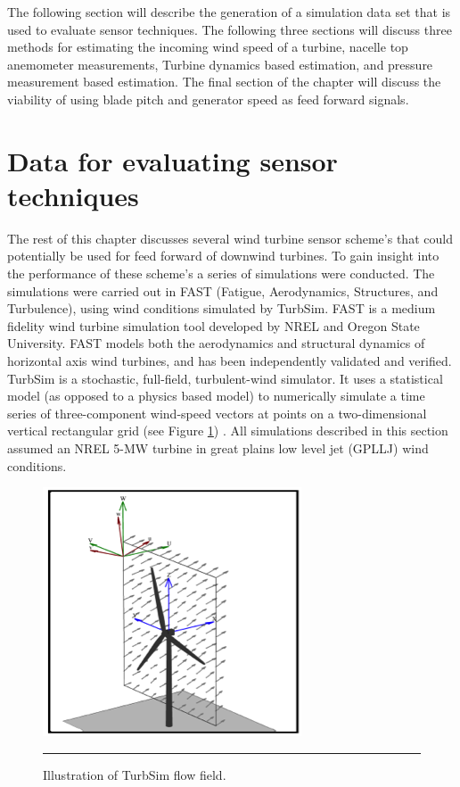 The following section will describe the generation of a simulation data set that is used to evaluate sensor techniques. The following three sections will discuss three methods for estimating the incoming wind speed of a turbine, nacelle top anemometer measurements, Turbine dynamics based estimation, and pressure measurement based estimation.  The final section of the chapter will discuss the viability of using blade pitch and generator speed as feed forward signals.




\section{Data for evaluating sensor techniques} \label{section2-2}

The rest of this chapter discusses several wind turbine sensor scheme’s that could potentially be used for feed forward of downwind turbines. To gain insight into the performance of these scheme’s a series of simulations were conducted. The simulations were carried out in FAST (Fatigue, Aerodynamics, Structures, and Turbulence), using wind conditions simulated by TurbSim. FAST is a medium fidelity wind turbine simulation tool developed by NREL and Oregon State University. FAST models both the aerodynamics and structural dynamics of horizontal axis wind turbines, and has been independently validated and verified\cite{manjock2005}. TurbSim is a stochastic, full-field, turbulent-wind simulator. It uses a statistical model (as opposed to a physics based model) to numerically simulate a time series of three-component wind-speed vectors at points on a two-dimensional vertical rectangular grid (see Figure \ref{fig2-2}) \cite{jonkman2012}. All simulations described in this section assumed an NREL 5-MW turbine in great plains low level jet (GPLLJ) wind conditions.

\begin{figure}[htbp]
	\centering
		\includegraphics{Figures/ch2Figures/fig2-2.png}
		\rule{35em}{0.5pt}
	\caption{Illustration of TurbSim flow field.\cite{jonkman2012}}
	\label{fig2-2}
\end{figure}

